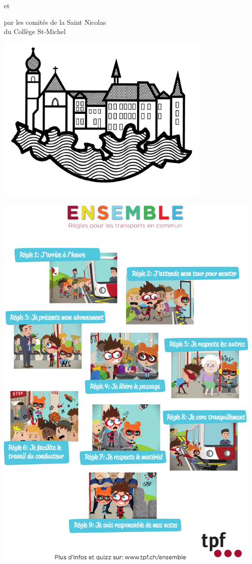 \vfill
\begin{center}
	{\Huge et}
\end{center}
\vfill

\begin{center}
{\Huge par les comités de la Saint Nicolas\vspace*{1mm}\\
du Collège St-Michel}
\vspace*{5mm}
\par
\includegraphics[width=0.8\textwidth]{fig/csm.jpg}
\end{center}


\clearpage
\thispagestyle{empty}%
{\centering
\includegraphics[width=.96\textwidth]{fig/ensemble.jpg}
\par
}
\clearpage
